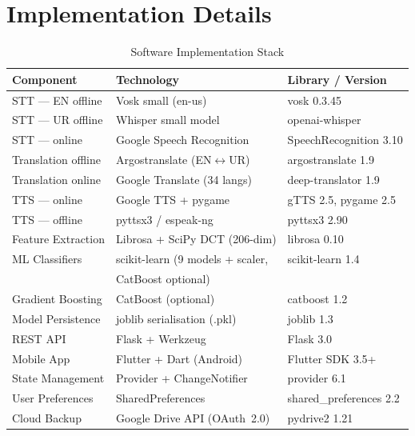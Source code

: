 \documentclass[10pt,twocolumn]{article}
\begin{document}
\section{Implementation Details}

\begin{table}[ht]
\centering
\caption{Software Implementation Stack}
\label{tab:stack}
\small
\begin{tabularx}{\columnwidth}{|l|l|X|}
\hline
\rowcolor{sdark}
\color{white}\textbf{Component} &
\color{white}\textbf{Technology} &
\color{white}\textbf{Library / Version} \\
\hline
STT — EN offline  & Vosk small (en-us)                 & vosk 0.3.45 \\
STT — UR offline  & Whisper small model                & openai-whisper \\
STT — online      & Google Speech Recognition          & SpeechRecognition 3.10 \\
Translation offline & Argostranslate (EN$\leftrightarrow$UR) & argostranslate 1.9 \\
Translation online  & Google Translate (34 langs)       & deep-translator 1.9 \\
TTS — online      & Google TTS + pygame                & gTTS 2.5, pygame 2.5 \\
TTS — offline     & pyttsx3 / espeak-ng                & pyttsx3 2.90 \\
Feature Extraction & Librosa + SciPy DCT (206-dim)     & librosa 0.10 \\
ML Classifiers    & scikit-learn (9 models + scaler,   & scikit-learn 1.4 \\
                  & CatBoost optional)                 & \\
Gradient Boosting & CatBoost (optional)                & catboost 1.2 \\
Model Persistence & joblib serialisation (.pkl)         & joblib 1.3 \\
REST API          & Flask + Werkzeug                   & Flask 3.0 \\
Mobile App        & Flutter + Dart (Android)            & Flutter SDK 3.5+ \\
State Management  & Provider + ChangeNotifier           & provider 6.1 \\
User Preferences  & SharedPreferences                  & shared\_preferences 2.2 \\
Cloud Backup      & Google Drive API (OAuth~2.0)        & pydrive2 1.21 \\
\hline
\end{tabularx}
\end{table}
\end{document}
